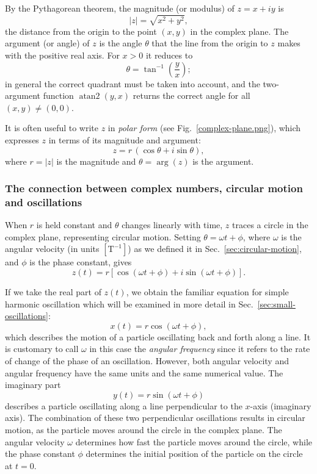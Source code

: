 \documentclass[../main.tex]{subfiles}
\theoremstyle{remark}
\begin{document}
By the Pythagorean theorem, the magnitude (or modulus) of $z = x + iy$ is
\begin{equation}
    |z| = \sqrt{x^2 + y^2},
\end{equation}
the distance from the origin to the point $(x,y)$ in the complex plane. The argument
(or angle) of $z$ is the angle $\theta$ that the line from the origin to $z$ makes with
the positive real axis. For $x > 0$ it reduces to
\begin{equation}
    \theta = \tan^{-1}\!\left(\frac{y}{x}\right);
\end{equation}
in general the correct quadrant must be taken into account, and the two-argument function
$\operatorname{atan2}(y,x)$ returns the correct angle for all $(x,y)\neq(0,0)$.

It is often useful to write $z$ in \emph{polar form} (see Fig.~\ref{complex-plane.png}), which expresses $z$ in terms of its magnitude and argument:
\begin{equation}
    z = r\,(\cos\theta + i\sin\theta),
\end{equation}
where $r = |z|$ is the magnitude and $\theta = \arg(z)$ is the argument. 


\subsubsection*{The connection between complex numbers, circular motion and oscillations}

When $r$ is held constant and $\theta$ changes linearly with time, $z$ traces a circle in the complex plane, representing circular motion. Setting $\theta = \omega t + \phi$, where
$\omega$ is the angular velocity (in units $[\mathrm{T}^{-1}]$) as we defined it in Sec.~\ref{sec:circular-motion}, and $\phi$ is
the phase constant, gives
\begin{equation}
    z(t) = r\left[\cos(\omega t+\phi)+i\sin(\omega t+\phi)\right].
\end{equation}
                
If we take the real part of $z(t)$, we obtain the familiar equation for simple harmonic oscillation which will be examined in more detail in Sec.~\ref{sec:small-oscillations}:
\begin{equation}
    x(t) = r\cos(\omega t+\phi),
\end{equation}
which describes the motion of a particle oscillating back and forth along a line. It is customary to call $\omega$ in this case the \emph{angular frequency} since it refers to the rate of change of the phase of an oscillation. However, both angular velocity and angular frequency have the same units and the same numerical value. The imaginary part 
\begin{equation}
    y(t) = r\sin(\omega t+\phi)
\end{equation}
describes a particle oscillating along a line perpendicular to the $x$-axis (imaginary axis). The combination of these two perpendicular oscillations results in circular motion, as the particle moves around the circle in the complex plane. The angular velocity $\omega$ determines how fast the particle moves around the circle, while the phase constant $\phi$ determines the initial position of the particle on the circle at $t=0$.
\end{document}
